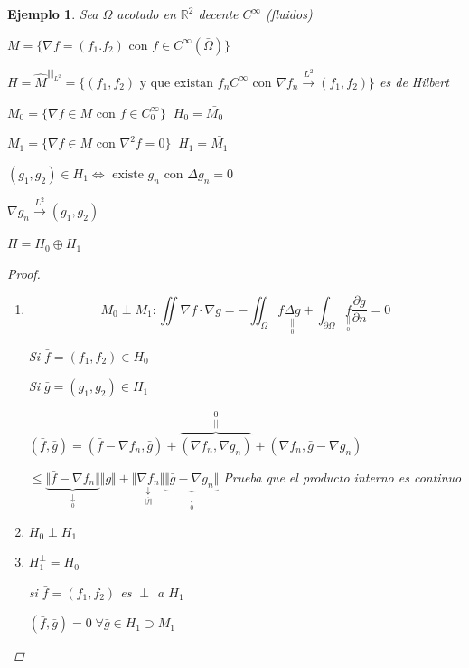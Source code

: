 \documentclass[a4paper,10pt]{book}
\newtheorem{ejemplo}{Ejemplo}
\begin{document}
\begin{ejemplo}
    Sea $ \Omega$ acotado en $\mathbb{R}^2$ decente $C^\infty$ (fluidos)  

    $M=\{ \nabla f= ( f_1.f_2) \text{  con  } f \in C^\infty (\bar{\Omega}) \} $

    $H = \widehat{M}^{\Vert \Vert_{L^2}} =  \{ (f_1,f_2)  \text{  y que existan  }  f_n C^\infty \text{  con  }  \nabla f_n \overset{L^2}{\rightarrow}(f_1,f_2)  \}$ es de Hilbert

    $M_0 =\{ \nabla f \in M \text{ con } f\in C_0^\infty   \} \;\; H_0= \bar{M_0}$
    
    $M_1= \{ \nabla f \in M \text{ con } \nabla^2 f = 0  \} \;\; H_1= \bar{M_1} $

    $(g_1,g_2) \in H_1 \Leftrightarrow \text{ existe } g_n  \text{ con }  \Delta g_n = 0 $

    $ \nabla g_n \overset{L^2}{\rightarrow} (g_1,g_2) $

    $ H = H_0 \oplus  H_1$

    \begin{proof}

    \begin{enumerate}
        \item \[ M_0 \perp M_1 : \iint \nabla f \cdot \nabla g = - \iint_\Omega  f \underset{  \underset{0}{\parallel}  }{\Delta g}  + \int_{\partial \Omega} \underset{  \underset{0}{\parallel}  }{f} \frac{\partial g}{ \partial n} = 0\]

        Si $\bar{f} = (f_1,f_2) \in H_0 $
    
        Si $\bar{g} = (g_1,g_2) \in H_1 $

        $(\bar{f},\bar{g}) = ( \bar{f} - \nabla f_n ,\bar{g} ) + \overset{0}{\overset{||}{\overbrace{ ( \nabla f_n, \nabla g_n ) } } } + (\nabla f_n, \bar{g} - \nabla g_n  )$ 

        $\leq \underset{ \underset{0}{\downarrow}}{ \underbrace{ \Vert \bar{f} -\nabla f_n \Vert } }  \Vert g\Vert + 
        \underset{\underset{\Vert \bar{f} \Vert}{\downarrow}}{\Vert \nabla f_n \Vert} \underset{\underset{0}{\downarrow}}{\underbrace{\Vert \bar{g}- \nabla g_n\Vert} } $  Prueba que el producto interno es continuo

        \item $H_0 \perp H_1 $ 
        \item $H_1^\perp = H_0$

         si $\bar{f}= (f_1,f_2)$ es $\perp$ a $H_1$ 
         
         $(\bar{f},\bar{g}) =0 \; \forall \bar{g} \in H_1 \supset M_1$


\end{enumerate}
\end{proof}
\end{ejemplo}
\end{document}
